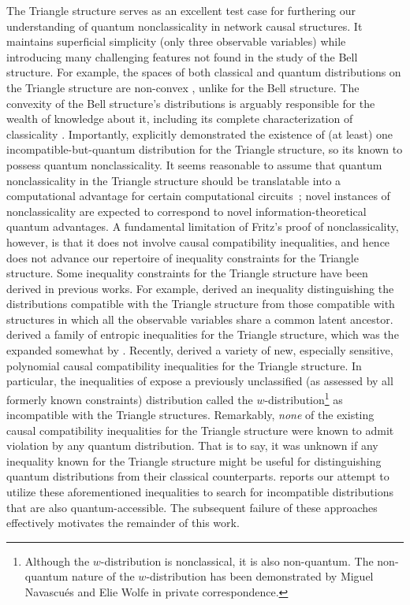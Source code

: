 \documentclass[aps, 10pt, english, twoside, pra, nofootinbib, tightenlines, longbibliography, superscriptaddress]{revtex4-1}
\begin{document}
    The Triangle structure serves as an excellent test case for furthering our understanding of quantum nonclassicality in network causal structures. It maintains superficial simplicity (only three observable variables) while introducing many challenging features not found in the study of the Bell structure.
    For example, the spaces of both classical and quantum distributions on the Triangle structure are non-convex \cite{Fritz_2012,Inflation}, unlike for the Bell structure. The convexity of the Bell structure's distributions is arguably responsible for the wealth of knowledge about it, including its complete characterization of classicality \cite{Brunner_2013}.
    Importantly, \citet{Fritz_2012} explicitly demonstrated the existence of (at least) one incompatible-but-quantum distribution for the Triangle structure, so its known to possess quantum nonclassicality. It seems reasonable to assume that quantum nonclassicality in the Triangle structure should be translatable into a computational advantage for certain computational circuits~\cite{Terhal_2002}; novel instances of nonclassicality are expected to correspond to novel information-theoretical quantum advantages. A fundamental limitation of Fritz's proof of nonclassicality, however, is that it does not involve causal compatibility inequalities, and hence does not advance our repertoire of inequality constraints for the Triangle structure.
    Some inequality constraints for the Triangle structure have been derived in previous works. For example, \citet{Steudel_2010} derived an inequality distinguishing the distributions compatible with the Triangle structure from those compatible with structures in which all the observable variables share a common latent ancestor. \citet{Henson_2014} derived a family of entropic inequalities for the Triangle structure, which was the expanded somewhat by \citet{Weilenmann_2016}. Recently, \citet{Inflation} derived a variety of new, especially sensitive, polynomial causal compatibility inequalities for the Triangle structure. In particular, the inequalities of \cite{Inflation} expose a previously unclassified (as assessed by all formerly known constraints) distribution called the $w$-distribution\footnote{Although the $w$-distribution is nonclassical, it is also non-quantum. The non-quantum nature of the $w$-distribution has been demonstrated by Miguel Navascués and Elie Wolfe in private correspondence.} as incompatible with the Triangle structures.
    Remarkably, \emph{none} of the existing causal compatibility inequalities for the Triangle structure were known to admit violation by any quantum distribution. That is to say, it was unknown if any inequality known for the Triangle structure might be useful for distinguishing quantum distributions from their classical counterparts.  reports our attempt to utilize these aforementioned inequalities to search for incompatible distributions that are also quantum-accessible. The subsequent failure of these approaches effectively motivates the remainder of this work.
\end{document}
